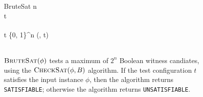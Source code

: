 

\begin{figure}[htbp]
\begin{center}

\begin{pseudocode}{BruteSat}{\phi}
	n \phi \\
	t   \\
\\
	\FOREACH t \in \{0, 1\}^n \DO
		\BEGIN
			\IF {}(\phi, t) 
				\THEN	{} \\

		\END \\
\end{pseudocode}

\caption{$\text{\sc BruteSat}(\phi)$ tests a maximum of $2^n$ Boolean witness candiates, using the $\text{\sc CheckSat}(\phi, B)$ algorithm.  If the test configuration $t$ satisfies the input instance $\phi$, then the algorithm returns \texttt{SATISFIABLE}; otherwise the algorithm returns \texttt{UNSATISFIABLE}.}
\label{bruteSat}
\end{center}
\end{figure}
